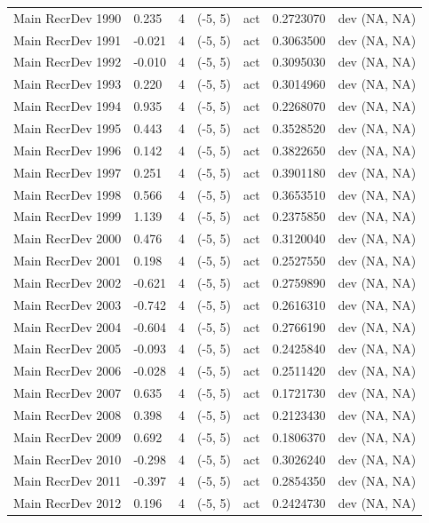 \documentclass[11pt,
  english,
]{article}
\begin{document}
\begin{landscape}
\begin{longtable}[t]{lllllll}
Main RecrDev 1990 & 0.235 & 4 & (-5, 5) & act & 0.2723070 & dev (NA, NA)\\
Main RecrDev 1991 & -0.021 & 4 & (-5, 5) & act & 0.3063500 & dev (NA, NA)\\
Main RecrDev 1992 & -0.010 & 4 & (-5, 5) & act & 0.3095030 & dev (NA, NA)\\
\addlinespace
Main RecrDev 1993 & 0.220 & 4 & (-5, 5) & act & 0.3014960 & dev (NA, NA)\\
Main RecrDev 1994 & 0.935 & 4 & (-5, 5) & act & 0.2268070 & dev (NA, NA)\\
Main RecrDev 1995 & 0.443 & 4 & (-5, 5) & act & 0.3528520 & dev (NA, NA)\\
Main RecrDev 1996 & 0.142 & 4 & (-5, 5) & act & 0.3822650 & dev (NA, NA)\\
Main RecrDev 1997 & 0.251 & 4 & (-5, 5) & act & 0.3901180 & dev (NA, NA)\\
\addlinespace
Main RecrDev 1998 & 0.566 & 4 & (-5, 5) & act & 0.3653510 & dev (NA, NA)\\
Main RecrDev 1999 & 1.139 & 4 & (-5, 5) & act & 0.2375850 & dev (NA, NA)\\
Main RecrDev 2000 & 0.476 & 4 & (-5, 5) & act & 0.3120040 & dev (NA, NA)\\
Main RecrDev 2001 & 0.198 & 4 & (-5, 5) & act & 0.2527550 & dev (NA, NA)\\
Main RecrDev 2002 & -0.621 & 4 & (-5, 5) & act & 0.2759890 & dev (NA, NA)\\
\addlinespace
Main RecrDev 2003 & -0.742 & 4 & (-5, 5) & act & 0.2616310 & dev (NA, NA)\\
Main RecrDev 2004 & -0.604 & 4 & (-5, 5) & act & 0.2766190 & dev (NA, NA)\\
Main RecrDev 2005 & -0.093 & 4 & (-5, 5) & act & 0.2425840 & dev (NA, NA)\\
Main RecrDev 2006 & -0.028 & 4 & (-5, 5) & act & 0.2511420 & dev (NA, NA)\\
Main RecrDev 2007 & 0.635 & 4 & (-5, 5) & act & 0.1721730 & dev (NA, NA)\\
\addlinespace
Main RecrDev 2008 & 0.398 & 4 & (-5, 5) & act & 0.2123430 & dev (NA, NA)\\
Main RecrDev 2009 & 0.692 & 4 & (-5, 5) & act & 0.1806370 & dev (NA, NA)\\
Main RecrDev 2010 & -0.298 & 4 & (-5, 5) & act & 0.3026240 & dev (NA, NA)\\
Main RecrDev 2011 & -0.397 & 4 & (-5, 5) & act & 0.2854350 & dev (NA, NA)\\
Main RecrDev 2012 & 0.196 & 4 & (-5, 5) & act & 0.2424730 & dev (NA, NA)\\

\end{longtable}
\end{landscape}
\end{document}
